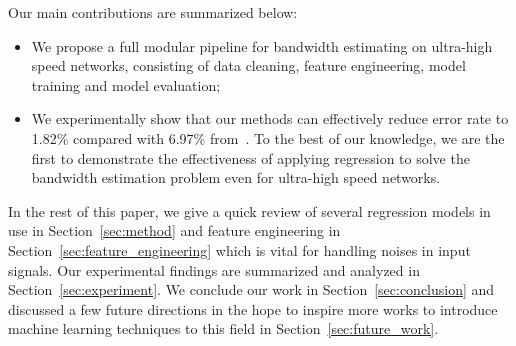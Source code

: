 Our main contributions are summarized below:
\begin{itemize}
\item We propose a full modular pipeline for bandwidth estimating on ultra-high
  speed networks, consisting of data cleaning, feature engineering, model
  training and model evaluation;
\item We experimentally show that our methods can effectively reduce error rate
  to 1.82\% compared with 6.97\% from~\cite{Yin2014}. To the best of our
  knowledge, we are the first to demonstrate the effectiveness of applying
  regression to solve the bandwidth estimation problem even for ultra-high
  speed networks.
\end{itemize}

In the rest of this paper, we give a quick review of several regression models
in use in Section~\ref{sec:method} and feature engineering in
Section~\ref{sec:feature_engineering} which is vital for handling noises in
input signals. Our experimental findings are summarized and analyzed in
Section~\ref{sec:experiment}. We conclude our work in
Section~\ref{sec:conclusion} and discussed a few future directions in the hope
to inspire more works to introduce machine learning techniques to this field in
Section~\ref{sec:future_work}.
